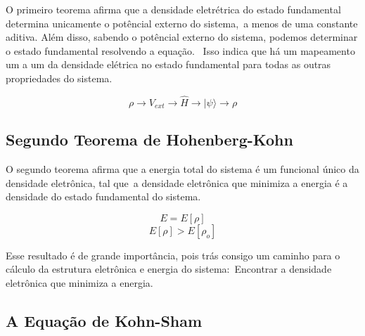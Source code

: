 O primeiro teorema afirma que a densidade eletrétrica do estado fundamental determina unicamente o potêncial externo do sistema,\
a menos de uma constante aditiva. Além disso, sabendo o potêncial externo do sistema, podemos determinar o estado fundamental resolvendo a equação. \
Isso indica que há um mapeamento um a um da densidade elétrica no estado fundamental para todas as outras propriedades do sistema.

\begin{equation}
    \rho \to V_{ext} \to \hat H \to |\psi\rangle \to \rho
\end{equation}

\subsection{Segundo Teorema de Hohenberg-Kohn}

O segundo teorema afirma que a energia total do sistema é um funcional único da densidade eletrônica, tal que\
a densidade eletrônica que minimiza a energia é a densidade do estado fundamental do sistema.

\begin{equation}
    E = E[\rho]
\end{equation}
\begin{equation}
    E[\rho] > E[\rho_o]
\end{equation}

Esse resultado é de grande importância, pois trás consigo um caminho para o cálculo da estrutura eletrônica e energia do sistema:\
Encontrar a densidade eletrônica que minimiza a energia.

\subsection{A Equação de Kohn-Sham}

